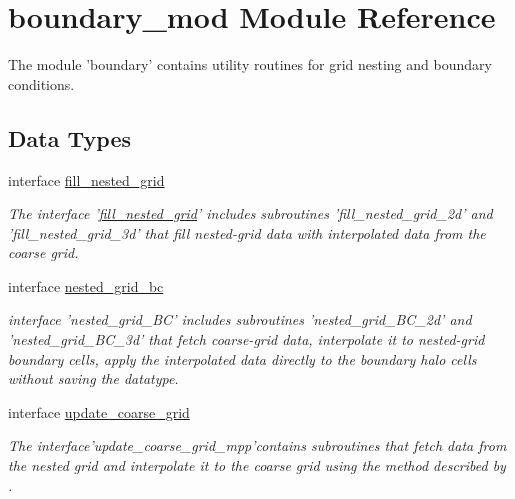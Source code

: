 \section{boundary\-\_\-mod Module Reference}
\label{classboundary__mod}


The module 'boundary' contains utility routines for grid nesting and boundary conditions.  


\subsection*{Data Types}
\begin{DoxyCompactItemize}
\item 
interface \hyperlink{interfaceboundary__mod_1_1fill__nested__grid}{fill\-\_\-nested\-\_\-grid}
\begin{DoxyCompactList}\small\item\em The interface '\hyperlink{interfaceboundary__mod_1_1fill__nested__grid}{fill\-\_\-nested\-\_\-grid}' includes subroutines 'fill\-\_\-nested\-\_\-grid\-\_\-2d' and 'fill\-\_\-nested\-\_\-grid\-\_\-3d' that fill nested-\/grid data with interpolated data from the coarse grid. \end{DoxyCompactList}\item 
interface \hyperlink{interfaceboundary__mod_1_1nested__grid__bc}{nested\-\_\-grid\-\_\-bc}
\begin{DoxyCompactList}\small\item\em interface 'nested\-\_\-grid\-\_\-\-B\-C' includes subroutines 'nested\-\_\-grid\-\_\-\-B\-C\-\_\-2d' and 'nested\-\_\-grid\-\_\-\-B\-C\-\_\-3d' that fetch coarse-\/grid data, interpolate it to nested-\/grid boundary cells, apply the interpolated data directly to the boundary halo cells without saving the datatype. \end{DoxyCompactList}\item 
interface \hyperlink{interfaceboundary__mod_1_1update__coarse__grid}{update\-\_\-coarse\-\_\-grid}
\begin{DoxyCompactList}\small\item\em The interface'update\-\_\-coarse\-\_\-grid\-\_\-mpp'contains subroutines that fetch data from the nested grid and interpolate it to the coarse grid using the method described by \cite{harris2013two}. \end{DoxyCompactList}\end{DoxyCompactItemize}
